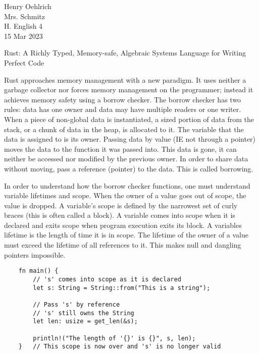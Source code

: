 \documentclass[12pt]{article}
\author{Henry Oehlrich}
\begin{document}
\begin{flushleft}
Henry Oehlrich \\
Mrs. Schmitz \\
H. English 4 \\
15 Mar 2023 \\
\begin{center}
Rust: A Richly Typed, Memory-safe, Algebraic Systems Language for Writing Perfect Code
\end{center}
\setlength{\parindent}{0.5in}


Rust approaches memory management with a new paradigm. It uses neither a
garbage collector nor forces memory management on the programmer; instead it
achieves memory safety using a borrow checker. The borrow checker has two
rules: data has one owner and data may have multiple readers or one writer.
When a piece of non-global data is instantiated, a sized portion of data from
the stack, or a chunk of data in the heap, is allocated to it. The variable
that the data is assigned to is its owner. Passing data by value (IE not
through a pointer) moves the data to the function it was passed into. This data
is gone, it can neither be accessed nor modified by the previous owner. In
order to share data without moving, pass a reference (pointer) to the data.
This is called borrowing. 

In order to understand how the borrow checker functions, one must understand
variable lifetimes and scope. When the owner of a value goes out of scope, the
value is dropped. A variable's scope is defined by the narrowest set of curly
braces (this is often called a block). A variable comes into scope when it is
declared and exits scope when program execution exits its block. A variables
lifetime is the length of time it is in scope. The lifetime of the owner of a
value must exceed the lifetime of all references to it. This makes null and
dangling pointers impossible.

\singlespacing{}
\begin{verbatim}
    fn main() {
        // 's' comes into scope as it is declared
        let s: String = String::from("This is a string");

        // Pass 's' by reference
        // 's' still owns the String
        let len: usize = get_len(&s);

        println!("The length of '{}' is {}", s, len);
    }   // This scope is now over and 's' is no longer valid


\end{verbatim}
\end{flushleft}
\end{document}
